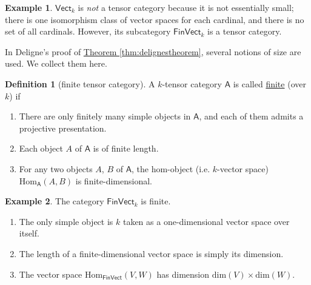 \documentclass[a4paper,10pt]{scrreprt}
\newcommand{\defn}[1]{\ul{#1}}
\newcommand{\Hom}{\mathrm{Hom}}
\theoremstyle{definition}
\newtheorem{definition}{Definition}[section]
\newtheorem{example}{Example}[section]
\theoremstyle{plain}
\theoremstyle{remark}
\begin{document}
\begin{example}
  $\mathsf{Vect}_{k}$ is \emph{not} a tensor category because it is not essentially small; there is one isomorphism class of vector spaces for each cardinal, and there is no set of all cardinals. However, its subcategory $\mathsf{FinVect}_{k}$ is a tensor category. 
\end{example}

In Deligne's proof of \hyperref[thm:delignestheorem]{Theorem \ref*{thm:delignestheorem}}, several notions of size are used. We collect them here.

\begin{definition}[finite tensor category]
  \label{def:finitetensorcategory}
  A $k$-tensor category $\mathsf{A}$ is called \defn{finite} (over $k$) if 
  \begin{enumerate}
    \item There are only finitely many simple objects in $\mathsf{A}$, and each of them admits a projective presentation. 

    \item Each object $A$ of $\mathsf{A}$ is of finite length.

    \item For any two objects $A$, $B$ of $\mathsf{A}$, the hom-object (i.e. $k$-vector space) $\Hom_{\mathsf{A}}(A, B)$ is finite-dimensional.
  \end{enumerate}
\end{definition}

\begin{example}
  The category $\mathsf{FinVect}_{k}$ is finite. 
  \begin{enumerate}
    \item The only simple object is $k$ taken as a one-dimensional vector space over itself.

    \item The length of a finite-dimensional vector space is simply its dimension.

    \item The vector space $\Hom_{\mathsf{FinVect}}(V, W)$ has dimension $\mathrm{dim}(V) \times\mathrm{dim}(W)$.
  \end{enumerate}
\end{example}
\end{document}
